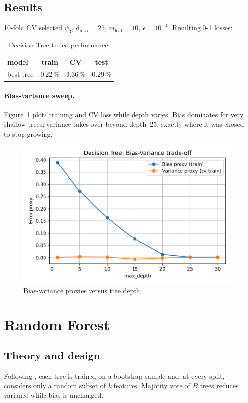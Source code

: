 \documentclass[12pt]{report}
\begin{document}
\subsection{Results}
10-fold CV selected $\psi_3$, $d_{\max}=25$, $m_{\text{leaf}}=10$,
$\epsilon=10^{-4}$.  Resulting 0-1 losses:

\begin{table}[ht]
  \centering
  \caption{Decision-Tree tuned performance.}
  \label{tab:tree-res}
  \begin{tabular}{lccc}
    \toprule
    model & train & CV & test \\ \midrule
    best tree & 0.22\,\% & 0.36\,\% & 0.29\,\% \\
    \bottomrule
  \end{tabular}
\end{table}

\paragraph{Bias-variance sweep.}
Figure~\ref{fig:tree-bv} plots training and CV loss while depth varies. Bias
dominates for very shallow trees; variance takes over beyond depth~25, exactly
where it was chosed to stop growing.

\begin{figure}[ht]
  \centering
  \includegraphics[width=.65\linewidth]{../plots/tree_sweep_bias_variance_approx.png}
  \caption{Bias-variance proxies versus tree depth.}
  \label{fig:tree-bv}
\end{figure}

\section{Random Forest}

\subsection{Theory and design}
Following \citet[p.\,256]{shalev}, each tree is trained on a bootstrap sample
and, at every split, considers only a random subset of $k$ features.  Majority
vote of $B$ trees reduces variance while bias is unchanged.
\end{document}
